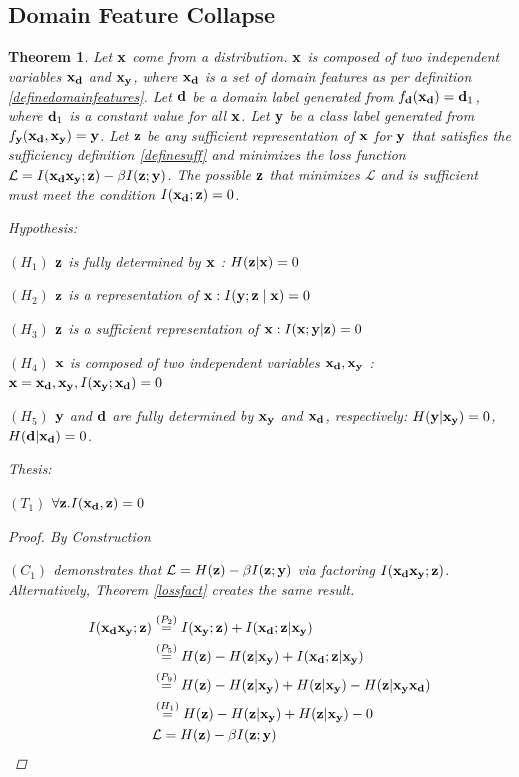 \documentclass[letterpaper]{article} %
\theoremstyle{plain}
\newtheorem{theorem}{Theorem}[section]
\theoremstyle{definition}
\theoremstyle{remark}
\begin{document}
\subsection{Domain Feature Collapse}

\begin{theorem}

Let ${\mathbf{x}}$ come from a distribution. ${\mathbf{x}}$ is composed of two independent variables ${\mathbf{x}}_{\mathbf{d}}$ and ${\mathbf{x}}_{\mathbf{y}}$, where ${\mathbf{x}}_{\mathbf{d}}$ is a set of domain features as per definition \ref{definedomainfeatures}. Let ${\mathbf{d}}$ be a domain label generated from $f_{\mathbf{d}}({\mathbf{x}}_{\mathbf{d}}) = {\mathbf{d}}_1$, where ${\mathbf{d}}_1$ is a constant value for all ${\mathbf{x}}$. Let ${\mathbf{y}}$ be a class label generated from $f_{\mathbf{y}}({\mathbf{x}}_{\mathbf{d}}, {\mathbf{x}}_{\mathbf{y}}) = {\mathbf{y}}$. Let ${\mathbf{z}}$ be any sufficient representation of ${\mathbf{x}}$ for ${\mathbf{y}}$ that satisfies the sufficiency definition \ref{definesuff} and minimizes the loss function $\mathcal{L} = I({\mathbf{x}}_{\mathbf{d}} {\mathbf{x}}_{\mathbf{y}}; {\mathbf{z}}) - \beta I({\mathbf{z}};{\mathbf{y}})$. The possible ${\mathbf{z}}$ that minimizes $\mathcal{L}$  and is sufficient must meet the condition $I({\mathbf{x}}_{\mathbf{d}}; {\mathbf{z}}) = 0$. 



Hypothesis: 

$(H_1)$  ${\mathbf{z}}$ is fully determined by ${\mathbf{x}}$ : $H({\mathbf{z}}|{\mathbf{x}}) = 0$

$(H_2)$  ${\mathbf{z}}$ is a representation of ${\mathbf{x}}: I({\mathbf{y}} ; {\mathbf{z}} \mid {\mathbf{x}})=0$

$(H_3)$  ${\mathbf{z}}$ is a sufficient representation of ${\mathbf{x}}: I({\mathbf{x}} ; {\mathbf{y}} | {\mathbf{z}})=0$

$(H_4)$ ${\mathbf{x}}$ is composed of two independent variables ${\mathbf{x}}_{\mathbf{d}}, {\mathbf{x}}_{\mathbf{y}}$ : ${\mathbf{x}} = {\mathbf{x}}_{\mathbf{d}}, {\mathbf{x}}_{\mathbf{y}}, I({\mathbf{x}}_{\mathbf{y}}; {\mathbf{x}}_{\mathbf{d}}) = 0$

$(H_5)$ ${\mathbf{y}}$  and ${\mathbf{d}}$ are fully determined by ${\mathbf{x}}_{\mathbf{y}}$ and ${\mathbf{x}}_{\mathbf{d}}$, respectively: $H({\mathbf{y}} | {\mathbf{x}}_{\mathbf{y}}) = 0$, $H({\mathbf{d}} | {\mathbf{x}}_{\mathbf{d}}) = 0$.

Thesis:

$(T_1)$ $\forall {\mathbf{z}}.I({\mathbf{x}}_{\mathbf{d}},{\mathbf{z}}) = 0$

\begin{proof} By Construction

$(C_1)$ demonstrates that $\mathcal{L}=H({\mathbf{z}}) -\beta I({\mathbf{z}};{\mathbf{y}})$ via factoring $I({\mathbf{x}}_{\mathbf{d}} {\mathbf{x}}_{\mathbf{y}};{\mathbf{z}})$. Alternatively, Theorem \ref{lossfact} creates the same result. 

$$
    \begin{aligned}
    I({\mathbf{x}}_{\mathbf{d}} {\mathbf{x}}_{\mathbf{y}}; {\mathbf{z}}) &\stackrel{\left(P_2\right)}{=} I({\mathbf{x}}_{\mathbf{y}}; {\mathbf{z}}) + I({\mathbf{x}}_{\mathbf{d}}; {\mathbf{z}}| {\mathbf{x}}_{\mathbf{y}})\\
    &\stackrel{\left(P_5\right)}{=} H({\mathbf{z}}) -  H({\mathbf{z}}| {\mathbf{x}}_{\mathbf{y}}) + I({\mathbf{x}}_{\mathbf{d}}; {\mathbf{z}}| {\mathbf{x}}_{\mathbf{y}}) \\
    &\stackrel{\left(P_9\right)}{=} H({\mathbf{z}}) -  H({\mathbf{z}}| {\mathbf{x}}_{\mathbf{y}}) + H({\mathbf{z}}| {\mathbf{x}}_{\mathbf{y}}) - H({\mathbf{z}}| {\mathbf{x}}_{\mathbf{y}} {\mathbf{x}}_{\mathbf{d}}) \\
    &\stackrel{\left(H_1\right)}{=}H({\mathbf{z}}) -  H({\mathbf{z}}| {\mathbf{x}}_{\mathbf{y}}) + H({\mathbf{z}}| {\mathbf{x}}_{\mathbf{y}}) - 0 \\
    &\mathcal{L}=H({\mathbf{z}})  -\beta I({\mathbf{z}}; {\mathbf{y}})
    \end{aligned}
$$


\end{proof}
\end{theorem}
\end{document}
